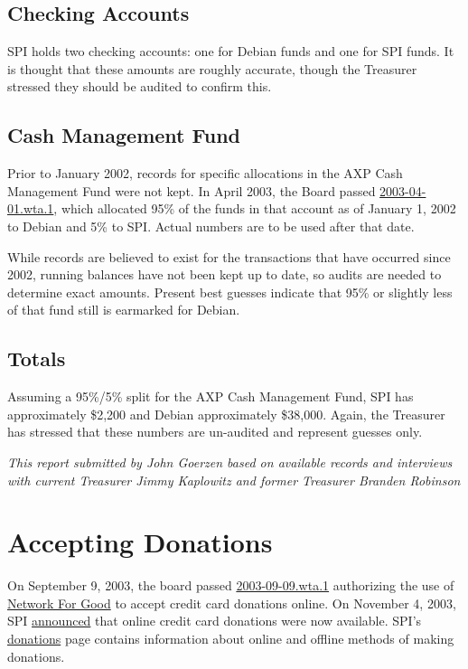 \documentclass[letterpaper]{report}
\begin{document}
\subsection{Checking Accounts}

SPI holds two checking accounts: one for Debian funds and one for
SPI funds. It is thought that these amounts are roughly accurate,
though the Treasurer stressed they should be audited to confirm this.


\subsection{Cash Management Fund}

Prior to January 2002, records for specific allocations in the AXP
Cash Management Fund were not kept. In April 2003, the Board passed
\href{http://www.spi-inc.org/corporate/resolutions/2003/2003-04-01.wta.1}{2003-04-01.wta.1},
which allocated 95\% of the funds in that account as of January 1,
2002 to Debian and 5\% to SPI. Actual numbers are to be used after
that date.

While records are believed to exist for the transactions that have
occurred since 2002, running balances have not been kept up to date,
so audits are needed to determine exact amounts. Present best guesses
indicate that 95\% or slightly less of that fund still is earmarked
for Debian.


\subsection{Totals}

Assuming a 95\%/5\% split for the AXP Cash Management Fund, SPI has
approximately \$2,200 and Debian approximately \$38,000. Again, the
Treasurer has stressed that these numbers are un-audited and represent
guesses only.

\emph{This report submitted by John Goerzen based on available records
and interviews with current Treasurer Jimmy Kaplowitz and former Treasurer
Branden Robinson}


\section{Accepting Donations}

On September 9, 2003, the board passed \href{http://www.spi-inc.org/corporate/resolutions/2003/2003-09-09.wta.1}{2003-09-09.wta.1}
authorizing the use of \href{http://www.networkforgood.org/}{Network For Good}
to accept credit card donations online. On November 4, 2003, SPI \href{http://www.spi-inc.org/news/2003/20031104}{announced}
that online credit card donations were now available. SPI's \href{http://www.spi-inc.org/donations}{donations}
page contains information about online and offline methods of making
donations.
\end{document}
